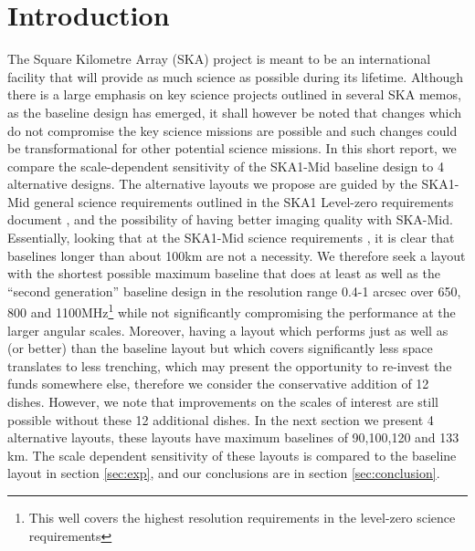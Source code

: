 \documentclass[sfheadings,a4paper,times,9pt,floats,floatfix]{article}
\begin{document}
\section{Introduction}
\vspace{-.1cm}
The Square Kilometre Array (SKA) project is meant to be an international facility that will provide as much science as possible
during its lifetime. Although there is a large emphasis on key science projects outlined in several SKA memos, as the baseline
design \cite{bd} has emerged, it shall however be noted that changes which do not compromise the key science missions are possible
and such changes could be transformational for other potential science missions. In this short report, we compare the
scale-dependent sensitivity of the SKA1-Mid baseline design to 4 alternative designs. The alternative layouts we propose are
guided by the SKA1-Mid general science requirements outlined in the SKA1 Level-zero requirements document \cite{srd}, and the
possibility of having better imaging quality with SKA-Mid. Essentially, looking that at the SKA1-Mid science requirements
\cite{srd}, it is clear that baselines longer than about 100km are not a necessity. We therefore seek a layout with the shortest
possible maximum baseline that does at least as well as the ``second generation'' baseline design in the resolution range 0.4-1
arcsec over 650, 800 and 1100MHz\footnote{This well covers the highest resolution requirements in the level-zero science
requirements} while not significantly compromising the performance at the larger angular scales. Moreover, having a layout which
performs just as well as (or better) than the baseline layout but which covers significantly less space translates to less
trenching, which may present the opportunity to re-invest the funds somewhere else, therefore we consider the conservative
addition of 12 dishes. However, we note that improvements on the scales of interest are still possible without these 12 additional
dishes. In the next section we present 4 alternative layouts, these layouts have maximum baselines of 90,100,120 and 133 km. The
scale dependent sensitivity of these layouts is compared to the baseline layout in section \ref{sec:exp}, and our conclusions are
in section \ref{sec:conclusion}.
\end{document}
